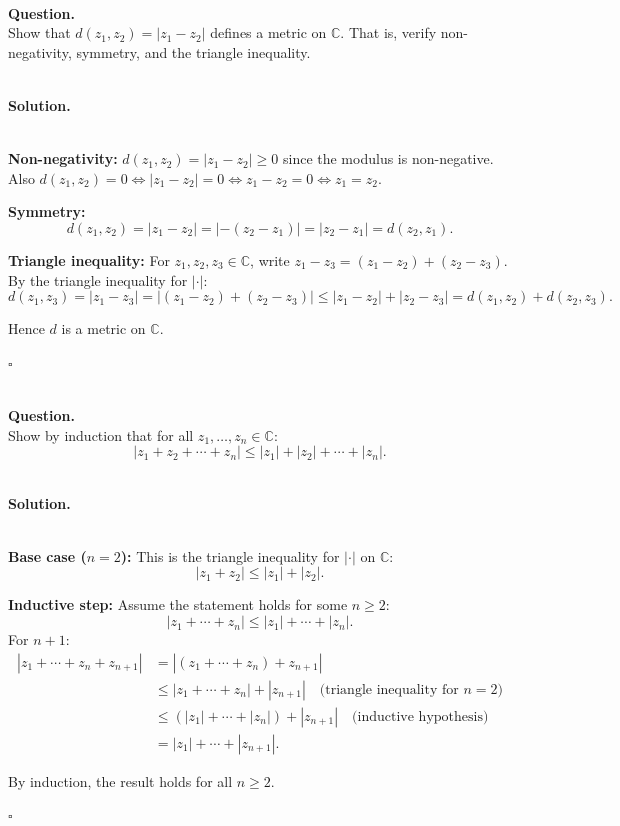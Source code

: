 \documentclass{article}
\begin{document}
\hfill \break  $~\!\!$ \dotfill \medskip \\
\textbf{Question.}\\
Show that $d(z_1, z_2) = |z_1 - z_2|$ defines a metric on $\mathbb{C}$. That is, verify non-negativity, symmetry, and the triangle inequality.

\noindent\\
\textbf{Solution.}\\
\quad\\
\begin{mdframed}[linewidth=1pt]
\textbf{Non-negativity:} $d(z_1, z_2) = |z_1 - z_2| \ge 0$ since the modulus is non-negative. Also $d(z_1, z_2) = 0 \iff |z_1 - z_2| = 0 \iff z_1 - z_2 = 0 \iff z_1 = z_2$.

\textbf{Symmetry:}
\[
d(z_1, z_2) = |z_1 - z_2| = |{-(z_2 - z_1)}| = |z_2 - z_1| = d(z_2, z_1).
\]

\textbf{Triangle inequality:} For $z_1, z_2, z_3 \in \mathbb{C}$, write $z_1 - z_3 = (z_1 - z_2) + (z_2 - z_3)$. By the triangle inequality for $|\cdot|$:
\[
d(z_1, z_3) = |z_1 - z_3| = |(z_1 - z_2) + (z_2 - z_3)| \le |z_1 - z_2| + |z_2 - z_3| = d(z_1, z_2) + d(z_2, z_3).
\]

Hence $d$ is a metric on $\mathbb{C}$.

\hfill $\square$
\end{mdframed}

\bigskip

\hfill \break  $~\!\!$ \dotfill \medskip \\
\textbf{Question.}\\
Show by induction that for all $z_1, \dots, z_n \in \mathbb{C}$:
\[
|z_1 + z_2 + \cdots + z_n| \le |z_1| + |z_2| + \cdots + |z_n|.
\]

\noindent\\
\textbf{Solution.}\\
\quad\\
\begin{mdframed}[linewidth=1pt]
\textbf{Base case ($n = 2$):} This is the triangle inequality for $|\cdot|$ on $\mathbb{C}$:
\[
|z_1 + z_2| \le |z_1| + |z_2|.
\]

\textbf{Inductive step:} Assume the statement holds for some $n \ge 2$:
\[
|z_1 + \cdots + z_n| \le |z_1| + \cdots + |z_n|.
\]
For $n+1$:
\begin{align*}
|z_1 + \cdots + z_n + z_{n+1}|
&= |(z_1 + \cdots + z_n) + z_{n+1}| \\
&\le |z_1 + \cdots + z_n| + |z_{n+1}| \quad \text{(triangle inequality for $n = 2$)} \\
&\le (|z_1| + \cdots + |z_n|) + |z_{n+1}| \quad \text{(inductive hypothesis)} \\
&= |z_1| + \cdots + |z_{n+1}|.
\end{align*}

By induction, the result holds for all $n \ge 2$.

\hfill $\square$
\end{mdframed}
\end{document}
